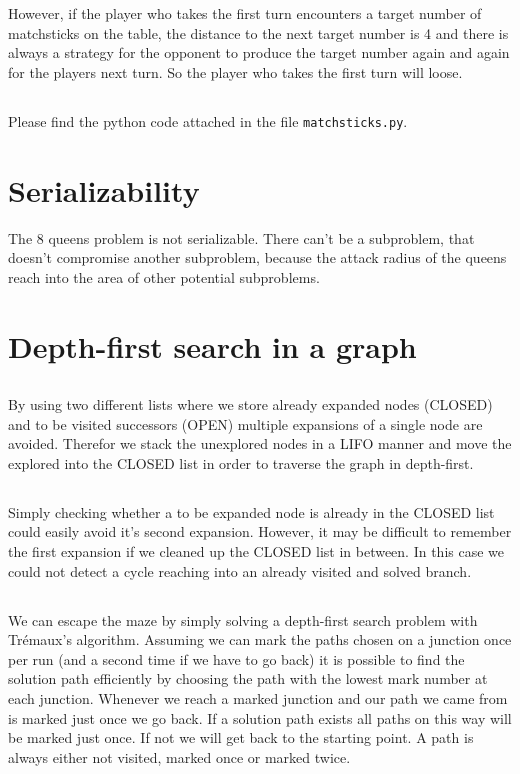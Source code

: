 \documentclass[11pt]{article}
\begin{document}
However, if the player who takes the first turn encounters a target number of matchsticks on the table, the distance to the next target number is 4 and there is always a strategy for the opponent to produce the target number again and again for the players next turn. So the player who takes the first turn will loose. 

\subsection{}
Please find the python code attached in the file \texttt{matchsticks.py}.

\section{Serializability}
The 8 queens problem is not serializable. There can't be a subproblem, that doesn't compromise another subproblem, because the attack radius of the queens reach into the area of other potential subproblems.

\section{Depth-first search in a graph}
\subsection{}
By using two different lists where we store already expanded nodes (CLOSED) and to be visited successors (OPEN) multiple expansions of a single node are avoided. Therefor we stack the unexplored nodes in a LIFO manner and move the explored into the CLOSED list in order to traverse the graph in depth-first.


\subsection{}
Simply checking whether a to be expanded node is already in the CLOSED list could easily avoid it's second expansion. However, it may be difficult to remember the first expansion if we cleaned up the CLOSED list in between. In this case we could not detect a cycle reaching into an already visited and solved branch.


\subsection{}
We can escape the maze by simply solving a depth-first search problem with Tr\'{e}maux's algorithm. Assuming we can mark the paths chosen on a junction once per run (and a second time if we have to go back) it is possible to find the solution path efficiently by choosing the path with the lowest mark number at each junction. Whenever we reach a marked junction and our path we came from is marked just once we go back. If a solution path exists all paths on this way will be marked just once. If not we will get back to the starting point. A path is always either not visited, marked once or marked twice.
\end{document}
